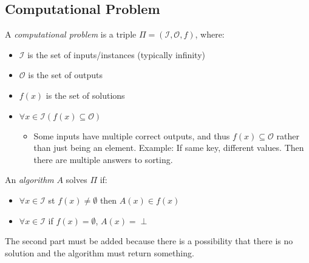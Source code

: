 \documentclass[11pt]{scrartcl}
\theoremstyle{dotlessP}
\theoremstyle{dotlessN}
\newcommand{\I}{\mathcal{I}}
\begin{document}
\subsection{Computational Problem}
 \begin{definition}
	 A \textit{computational problem} is a triple $\Pi = (\mathcal{I}, \mathcal{O}, f)$, where:
	 \begin{itemize}
		 \item $\mathcal{I}$ is the set of inputs/instances (typically infinity)
		 \item $\mathcal{O}$ is the set of outputs
		\item $f(x)$ is the set of solutions
		\item $\forall x \in \mathcal{I}(f(x) \subseteq \mathcal{O})$
			\begin{itemize}
				\item Some inputs have multiple correct outputs, and thus $f(x) \subseteq \mathcal{O}$ rather than just being an element. Example: If same key, different values. Then there are multiple answers to sorting.
			\end{itemize}
	 \end{itemize}
\end{definition}
\begin{definition}
	[Algorithm]
	An \textit{algorithm} $A$ solves $\Pi$ if:
	\begin{itemize}
		\item $\forall x \in \I$ st $f(x) \neq \emptyset$ then $A(x) \in f(x)$ 
		\item $\forall x \in \I$ if $f(x)= \emptyset$, $A(x) = \perp$
	\end{itemize}
\end{definition}
\begin{remark}
	The second part must be added because there is a possibility that there is no solution and the algorithm must return something.
\end{remark}
\end{document}
